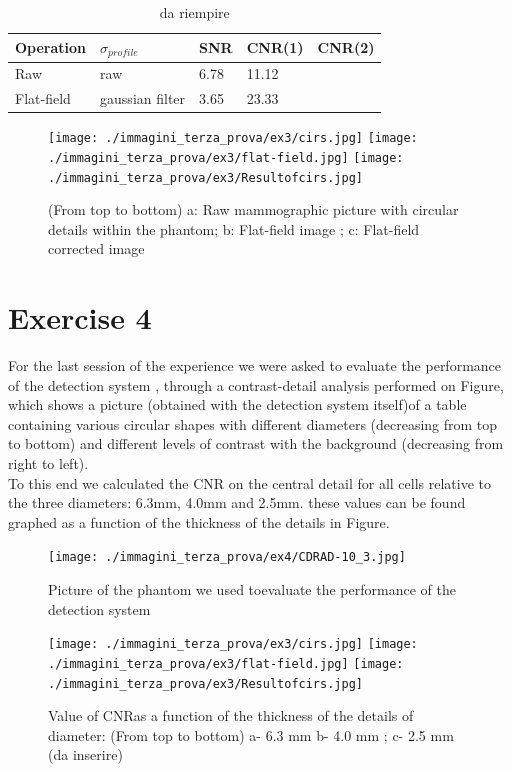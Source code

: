 \documentclass{article}
\begin{document}
\begin{table}[h]
	\begin {center}
	\begin{tabular}{| l | l | l | l | l |}
		\hline
		 Operation & $\sigma_{profile}$ & SNR & CNR(1) & CNR(2)\\ \hline
		Raw& raw & 6.78 & 11.12  &\\ \hline
		 Flat-field& gaussian filter & 3.65 & 23.33 &\\ \hline 
		
	\end{tabular}
	\caption{da riempire}
\end{center}
\end{table}
\clearpage

\begin{figure}[h]
	\centering
	\texttt{[image: ./immagini\_terza\_prova/ex3/cirs.jpg]}
	\bigbreak
	\texttt{[image: ./immagini\_terza\_prova/ex3/flat-field.jpg]}
	\bigbreak
	\texttt{[image: ./immagini\_terza\_prova/ex3/Resultofcirs.jpg]}
	\bigbreak
	
	\caption{ (From top to bottom) a: Raw mammographic picture with circular details within the phantom; b: Flat-field image ; c: Flat-field corrected image}\label{two}
\end{figure}
\clearpage
\section*{Exercise 4}
For the last session of the experience we were asked to evaluate the performance of the detection system , through a contrast-detail analysis  performed on Figure, which shows a picture (obtained with the detection system itself)of a table containing various circular shapes with different diameters (decreasing from top to bottom) and different levels of contrast with the background (decreasing from right to left). \\
To this end we calculated the CNR on the central detail for all cells relative to the three diameters: 6.3mm, 4.0mm and 2.5mm. these values can be found graphed as a function of the thickness of the details in Figure.

\begin{figure}[h]
	\centering
	\bigbreak
	\texttt{[image: ./immagini\_terza\_prova/ex4/CDRAD-10\_3.jpg]}
	\bigbreak
	\caption{Picture of the phantom we used toevaluate the performance of the detection system   }\label{two}
\end{figure}
\clearpage
\begin{figure}[h]
	\centering
	\texttt{[image: ./immagini\_terza\_prova/ex3/cirs.jpg]}
	\bigbreak
	\texttt{[image: ./immagini\_terza\_prova/ex3/flat-field.jpg]}
	\bigbreak
	\texttt{[image: ./immagini\_terza\_prova/ex3/Resultofcirs.jpg]}
	\bigbreak
	
	\caption{ Value of CNRas a function of the thickness of the details of diameter: (From top to bottom) a- 6.3 mm b- 4.0 mm ; c- 2.5 mm (da inserire)}\label{two}
\end{figure}
\end{document}
